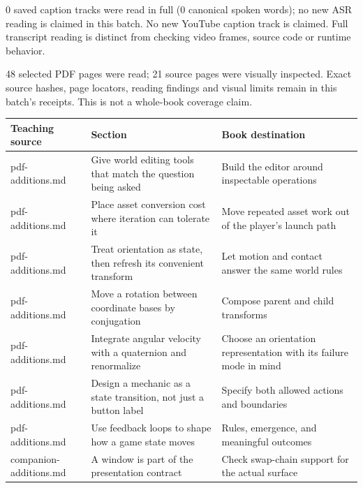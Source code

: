 \hypertarget{appendix-877738f6f4d2-batch-010-expanded-reading-and-integration}{}

0 saved caption tracks were read in full (0 canonical spoken words); no new ASR reading is claimed in this batch. No new YouTube caption track is claimed. Full transcript reading is distinct from checking video frames, source code or runtime behavior.

48 selected PDF pages were read; 21 source pages were visually inspected. Exact source hashes, page locators, reading findings and visual limits remain in this batch's receipts. This is not a whole-book coverage claim.

{\def\LTcaptype{none} %
\begin{longtable}[]{@{}
  >{\raggedright\arraybackslash}p{}
  >{\raggedright\arraybackslash}p{}
  >{\raggedright\arraybackslash}p{}@{}}
\toprule\noalign{}
\begin{minipage}[b]{\linewidth}\raggedright
Teaching source
\end{minipage} & \begin{minipage}[b]{\linewidth}\raggedright
Section
\end{minipage} & \begin{minipage}[b]{\linewidth}\raggedright
Book destination
\end{minipage} \\
\midrule\noalign{}
\endhead
\bottomrule\noalign{}
\endlastfoot
pdf-additions.md & Give world editing tools that match the question being asked & Build the editor around inspectable operations \\
pdf-additions.md & Place asset conversion cost where iteration can tolerate it & Move repeated asset work out of the player's launch path \\
pdf-additions.md & Treat orientation as state, then refresh its convenient transform & Let motion and contact answer the same world rules \\
pdf-additions.md & Move a rotation between coordinate bases by conjugation & Compose parent and child transforms \\
pdf-additions.md & Integrate angular velocity with a quaternion and renormalize & Choose an orientation representation with its failure mode in mind \\
pdf-additions.md & Design a mechanic as a state transition, not just a button label & Specify both allowed actions and boundaries \\
pdf-additions.md & Use feedback loops to shape how a game state moves & Rules, emergence, and meaningful outcomes \\
companion-additions.md & A window is part of the presentation contract & Check swap-chain support for the actual surface \\
\end{longtable}
}

